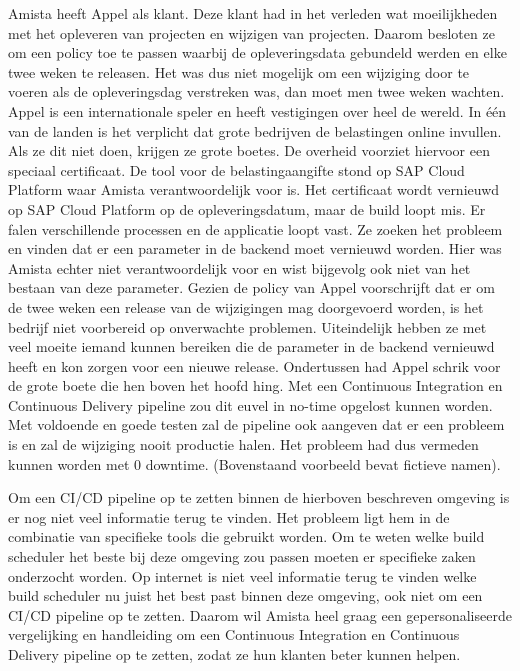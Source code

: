 Amista heeft Appel als klant. Deze klant had in het verleden wat moeilijkheden met het opleveren van projecten en wijzigen van projecten. Daarom besloten ze om een policy toe te passen waarbij de opleveringsdata gebundeld werden en elke twee weken te releasen. Het was dus niet mogelijk om een wijziging door te voeren als de opleveringsdag verstreken was, dan moet men twee weken wachten. 
Appel is een internationale speler en heeft vestigingen over heel de wereld. In één van de landen is het verplicht dat grote bedrijven de belastingen online invullen. Als ze dit niet doen, krijgen ze grote boetes. De overheid voorziet hiervoor een speciaal certificaat. De tool voor de belastingaangifte stond op SAP Cloud Platform waar Amista verantwoordelijk voor is. Het certificaat wordt vernieuwd op SAP Cloud Platform op de opleveringsdatum, maar de build loopt mis. Er falen verschillende processen en de applicatie loopt vast. Ze zoeken het probleem en vinden dat er een parameter in de backend moet vernieuwd worden. Hier was Amista echter niet verantwoordelijk voor en wist bijgevolg ook niet van het bestaan van deze parameter. Gezien de policy van Appel voorschrijft dat er om de twee weken een release van de wijzigingen mag doorgevoerd worden, is het bedrijf niet voorbereid op onverwachte problemen. Uiteindelijk hebben ze met veel moeite iemand kunnen bereiken die de parameter in de backend vernieuwd heeft en kon zorgen voor een nieuwe release. Ondertussen  had Appel schrik voor de grote boete die hen boven het hoofd hing.
Met een Continuous Integration en Continuous Delivery pipeline zou dit euvel in no-time opgelost kunnen worden. Met voldoende en goede testen zal de pipeline ook aangeven dat er een probleem is en zal de wijziging nooit productie halen. Het probleem had dus vermeden kunnen worden met 0 downtime.
(Bovenstaand voorbeeld bevat fictieve namen).

Om een CI/CD pipeline op te zetten binnen de hierboven beschreven omgeving is er nog niet veel informatie terug te vinden. Het probleem ligt hem in de combinatie van specifieke tools die gebruikt worden. Om te weten welke build scheduler het beste bij deze omgeving zou passen moeten er specifieke zaken onderzocht worden. Op internet is niet veel informatie terug te vinden welke build scheduler nu juist het best past binnen deze omgeving, ook niet om een CI/CD pipeline op te zetten. Daarom wil Amista heel graag een gepersonaliseerde vergelijking en handleiding om een Continuous Integration en Continuous Delivery pipeline op te zetten, zodat ze hun klanten beter kunnen helpen.

